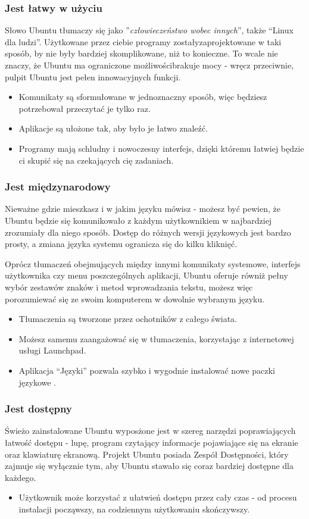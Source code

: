 \subsubsection{Jest łatwy w użyciu}
Słowo Ubuntu tłumaczy się jako ”\textit{człowieczeństwo wobec innych}”,  także “Linux dla ludzi”. Użytkowane przez ciebie programy zostałyzaprojektowane w taki sposób, by nie były bardziej skomplikowane, niż to konieczne. To wcale nie znaczy, że Ubuntu ma ograniczone możliwościbrakuje mocy - wręcz przeciwnie, pulpit Ubuntu jest pełen innowacyjnych funkcji.
\begin{itemize}
\item Komunikaty są sformułowane w jednoznaczny sposób, więc będziesz potrzebował przeczytać je tylko raz.
\item Aplikacje są ułożone tak, aby było je łatwo znaleźć.
\item Programy mają schludny i nowoczesny interfejs, dzięki któremu łatwiej będzie ci skupić się na czekających cię zadaniach.
\end{itemize}

\subsubsection{Jest międzynarodowy}
Nieważne gdzie mieszkasz i w jakim języku mówisz - możesz być pewien, że Ubuntu będzie się komunikowało z każdym użytkownikiem w najbardziej zrozumiały dla niego sposób. Dostęp do różnych wersji językowych jest bardzo prosty, a zmiana języka systemu ogranicza się do kilku kliknięć.

Oprócz  tłumaczeń obejmujących między innymi komunikaty systemowe, interfejs użytkownika czy menu poszczególnych aplikacji, Ubuntu oferuje równiż pełny wybór zestawów znaków i metod wprowadzania tekstu, możesz więc porozumiewać się ze swoim komputerem w dowolnie wybranym języku.
\begin{itemize}
\item Tłumaczenia są tworzone przez ochotników z całego świata.
\item Możesz samemu zaangażować się w tłumaczenia, korzystając z internetowej usługi Launchpad.
\item Aplikacja “Języki” pozwala szybko i wygodnie instalować nowe paczki językowe .
\end{itemize}

\subsubsection{Jest dostępny}
Świeżo zainstalowane Ubuntu wyposżone jest w szereg narzędzi poprawiających łatwość dostępu - lupę, program czytający informacje pojawiające się na ekranie oraz klawiaturę ekranową. Projekt Ubuntu posiada Zespół Dostępności, który zajmuje się wyłącznie tym, aby Ubuntu stawało się coraz bardziej dostępne dla każdego.
\begin{itemize}
\item Użytkownik może korzystać z ułatwień dostępu przez cały czas - od procesu instalacji począwszy, na codziennym użytkowaniu skończywszy.
\end{itemize}

